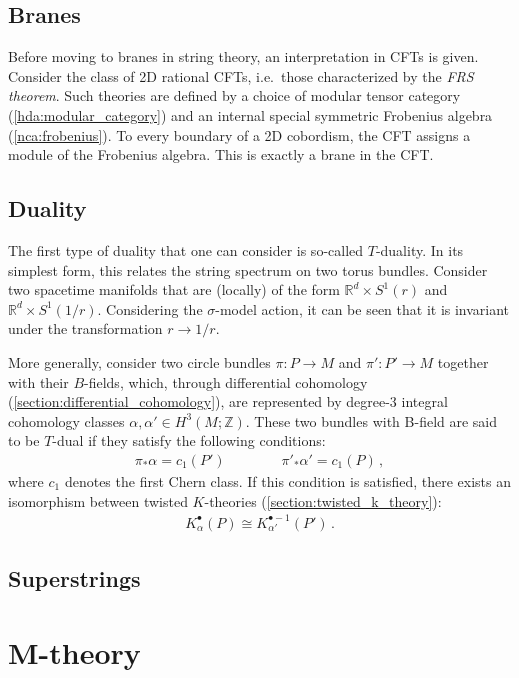 \subsection{Branes}

    Before moving to branes in string theory, an interpretation in CFTs is given. Consider the class of 2D rational CFTs, i.e.~those characterized by the \textit{FRS theorem}. Such theories are defined by a choice of modular tensor category (\cref{hda:modular_category}) and an internal special symmetric Frobenius algebra (\cref{nca:frobenius}). To every boundary of a 2D cobordism, the CFT assigns a module of the Frobenius algebra. This is exactly a brane in the CFT.


\subsection{Duality}

    The first type of duality that one can consider is so-called $T$-duality. In its simplest form, this relates the string spectrum on two torus bundles. Consider two spacetime manifolds that are (locally) of the form $\mathbb{R}^d\times S^1(r)$ and $\mathbb{R}^d\times S^1(1/r)$. Considering the $\sigma$-model action, it can be seen that it is invariant under the transformation $r\longrightarrow 1/r$.

    More generally, consider two circle bundles $\pi:P\rightarrow M$ and $\pi':P'\rightarrow M$ together with their $B$-fields, which, through differential cohomology (\cref{section:differential_cohomology}), are represented by degree-3 integral cohomology classes $\alpha,\alpha'\in H^3(M;\mathbb{Z})$. These two bundles with B-field are said to be $T$-dual if they satisfy the following conditions:
    \begin{gather}
        \pi_*\alpha=c_1(P')\qquad\qquad\pi'_*\alpha'=c_1(P)\,,
    \end{gather}
    where $c_1$ denotes the first Chern class. If this condition is satisfied, there exists an isomorphism between twisted $K$-theories (\cref{section:twisted_k_theory}):
    \begin{gather}
        K^\bullet_\alpha(P)\cong K^{\bullet-1}_{\alpha'}(P')\,.
    \end{gather}


\subsection{Superstrings}


\section{M-theory}

